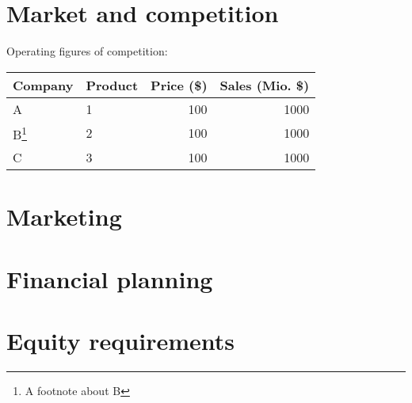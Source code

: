 \documentclass[a4paper,11pt]{article}
\begin{document}
\section{Market and competition}
Operating figures of competition:
\begin{center}
\begin{tabular}{l|l|r|r}
Company & Product & Price (\$) & \pbox{20cm}{Sales\\(Mio. \$)}\\
\hline
A & 1 & 100 & 1000\\
B\footnote{A footnote about B} & 2 & 100 & 1000\\
C & 3 & 100 & 1000\\
\end{tabular}
\end{center}

\section{Marketing}

\section{Financial planning}

\section{Equity requirements}
\end{document}

